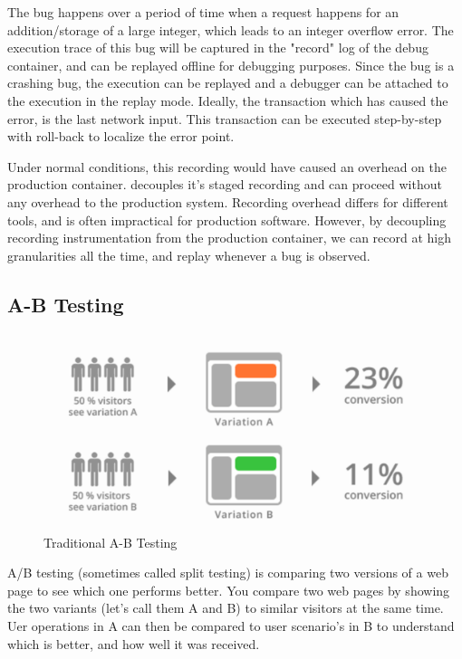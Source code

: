 The bug happens over a period of time when a request happens for an addition/storage of a large integer, which leads to an integer overflow error.
The execution trace of this bug will be captured in the "record" log of the debug container, and can be replayed offline for debugging purposes.
Since the bug is a crashing bug, the execution can be replayed and a debugger can be attached to the execution in the replay mode.
Ideally, the transaction which has caused the error, is the last network input. 
This transaction can be executed step-by-step with roll-back to localize the error point.

Under normal conditions, this recording would have caused an overhead on the production container. 
\parikshan decouples it's staged recording and can proceed without any overhead to the production system.
Recording overhead differs for different tools, and is often impractical for production software. 
However, by decoupling recording instrumentation from the production container, we can record at high granularities all the time, and replay whenever a bug is observed.

\subsection{A-B Testing}

\begin{figure}[h!]
	
	\centering
	\includegraphics[width=0.99\textwidth]{guided/figs/ABTesting.pdf}
	\caption{Traditional A-B Testing}
	\label{fig:abTesting}
\end{figure}

A/B testing (sometimes called split testing) is comparing two versions of a web page to see which one performs better. 
You compare two web pages by showing the two variants (let's call them A and B) to similar visitors at the same time.
Uer operations in A can then be compared to user scenario's in B to understand which is better, and how well it was received.


